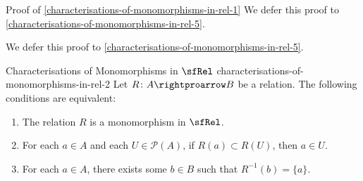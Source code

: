 \begin{Proof}{Proof of \cref{characterisations-of-monomorphisms-in-rel-1}}
    We defer this proof to \cref{characterisations-of-monomorphisms-in-rel-5}.

    We defer this proof to \cref{characterisations-of-monomorphisms-in-rel-5}.
\end{Proof}
\begin{proposition}{Characterisations of Monomorphisms in $\sfRel$ \rmII}{characterisations-of-monomorphisms-in-rel-2}%
    Let $R\colon A\rightproarrow B$ be a relation. The following conditions are equivalent:%
    \begin{enumerate}
        \item\label{characterisations-of-monomorphisms-in-rel-2-1}The relation $R$ is a monomorphism in $\sfRel$.
        \item\label{characterisations-of-monomorphisms-in-rel-2-2}For each $a\in A$ and each $U\in\mathcal{P}(A)$, if $R(a)\subset R(U)$, then $a\in U$.
        \item\label{characterisations-of-monomorphisms-in-rel-2-3}For each $a\in A$, there exists some $b\in B$ such that $R^{-1}(b)=\{a\}$.
    \end{enumerate}
\end{proposition}
